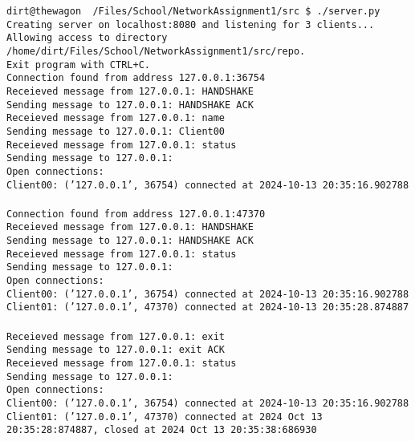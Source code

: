 \documentclass{article}
\begin{document}
\texttt{dirt@thewagon ~/Files/School/NetworkAssignment1/src \$ ./server.py\\
Creating server on localhost:8080 and listening for 3 clients...\\
Allowing access to directory /home/dirt/Files/School/NetworkAssignment1/src/repo.\\
Exit program with CTRL+C.\\
Connection found from address 127.0.0.1:36754\\
Receieved message from 127.0.0.1: HANDSHAKE\\
Sending message to 127.0.0.1: HANDSHAKE ACK\\
Receieved message from 127.0.0.1: name\\
Sending message to 127.0.0.1: Client00\\
Receieved message from 127.0.0.1: status\\
Sending message to 127.0.0.1: \\
Open connections:\\
Client00: ('127.0.0.1', 36754) connected at 2024-10-13 20:35:16.902788\\
\\
Connection found from address 127.0.0.1:47370\\
Receieved message from 127.0.0.1: HANDSHAKE\\
Sending message to 127.0.0.1: HANDSHAKE ACK\\
Receieved message from 127.0.0.1: status\\
Sending message to 127.0.0.1: \\
Open connections:\\
Client00: ('127.0.0.1', 36754) connected at 2024-10-13 20:35:16.902788\\
Client01: ('127.0.0.1', 47370) connected at 2024-10-13 20:35:28.874887\\
\\
Receieved message from 127.0.0.1: exit\\
Sending message to 127.0.0.1: exit ACK\\
Receieved message from 127.0.0.1: status\\
Sending message to 127.0.0.1: \\
Open connections:\\
Client00: ('127.0.0.1', 36754) connected at 2024-10-13 20:35:16.902788\\
Client01: ('127.0.0.1', 47370) connected at 2024 Oct 13 20:35:28:874887, closed at 2024 Oct 13 20:35:38:686930\\
\\
}
\end{document}
